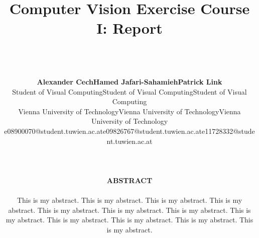 \documentclass[a4paper,psfig,subfigure,epsfig,fleqn,ausarbeitung,amssmb,float,caption,fontenc]{article}
\begin{document}
\date{}

\title{%
  \fontsize{14}{14pt} \bf Computer Vision Exercise Course I: Report}

\author{~\\
  ~\\
  \fontsize{12}{12pt}
  \begin{tabular}[t]{c c c}
  {\bf Alexander Cech}                    & {\bf Hamed Jafari-Sahamieh}             & {\bf Patrick Link}                      \\
  \small{Student of Visual Computing}     & \small{Student of Visual Computing}     & \small{Student of Visual Computing}     \\
  \small{Vienna University of Technology} & \small{Vienna University of Technology} & \small{Vienna University of Technology} \\
  \small{e08900070@student.tuwien.ac.at}  & \small{e09826767@student.tuwien.ac.at}  & \small{e11728332@student.tuwien.ac.at}  \\
  \end{tabular}
  ~\\ ~\\ ~\\
  \normalsize
  {\bf ABSTRACT} \\ 
  \noindent
  \hspace{0.2cm}
  \begin{minipage}[c]{15cm}
  \normalsize This is my abstract.  This is my abstract.  This is my
    abstract.  This is my abstract.  This is my abstract.  This is my
    abstract.  This is my abstract.  This is my abstract.  This is my
    abstract.  This is my abstract.  This is my abstract.  This is my
    abstract.\\
  \end{minipage}
  \normalsize
  }

\maketitle

\normalfont
\thispagestyle{empty}
\end{document}
